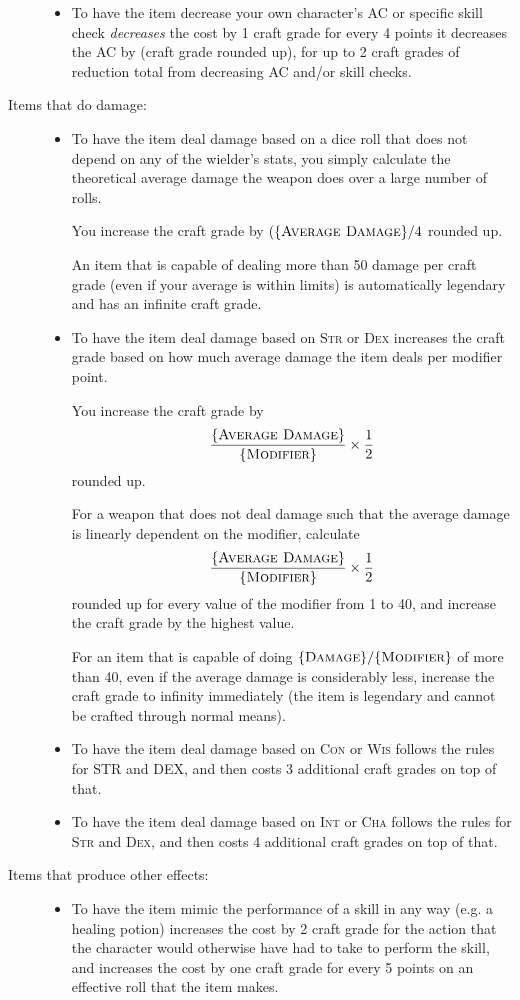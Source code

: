 \begin{description}
\begin{itemize}
		\item To have the item decrease your own character's AC or specific skill check \emph{decreases} the cost by 1 craft grade for every 4 points it decreases the AC by (craft grade rounded up), for up to 2 craft grades of reduction total from decreasing AC and/or skill checks.
	\end{itemize}
	\item[Items that do damage:] \hfill
	\begin{itemize}
		\item To have the item deal damage based on a dice roll that does not depend on any of the wielder's stats, you simply calculate the theoretical average damage the weapon does over a large number of rolls.
		
		You increase the craft grade by $(\{ \textsc{Average Damage} \}/4$ rounded up.
		
		An item that is capable of dealing more than 50 damage per craft grade (even if your average is within limits) is automatically legendary and has an infinite craft grade.
		
		\item To have the item deal damage based on \textsc{Str} or \textsc{Dex} increases the craft grade based on how much average damage the item deals per modifier point.
		
		You increase the craft grade by $$\frac{\{ \textsc{Average Damage} \} }{\{ \textsc{Modifier} \}} \times \frac 1 2$$ rounded up.
		
		For a weapon that does not deal damage such that the average damage is linearly dependent on the modifier, calculate $$\frac{\{ \textsc{Average Damage} \} }{\{ \textsc{Modifier} \}} \times \frac 1 2$$ rounded up for every value of the modifier from 1 to 40, and increase the craft grade by the highest value.
		
		For an item that is capable of doing $\{ \textsc{Damage} \}/\{ \textsc{Modifier} \}$ of more than 40, even if the average damage is considerably less, increase the craft grade to infinity immediately (the item is legendary and cannot be crafted through normal means).
		
		\item To have the item deal damage based on \textsc{Con} or \textsc{Wis} follows the rules for STR and DEX, and then costs 3 additional craft grades on top of that.
		
		\item To have the item deal damage based on \textsc{Int} or \textsc{Cha} follows the rules for \textsc{Str} and \textsc{Dex}, and then costs 4 additional craft grades on top of that.
	\end{itemize}
	\item[Items that produce other effects:] \hfill
	\begin{itemize}
		\item To have the item mimic the performance of a skill in any way (e.g. a healing potion) increases the cost by 2 craft grade for the action that the character would otherwise have had to take to perform the skill, and increases the cost by one craft grade for every 5 points on an effective roll that the item makes.
		

\end{itemize}
\end{description}
